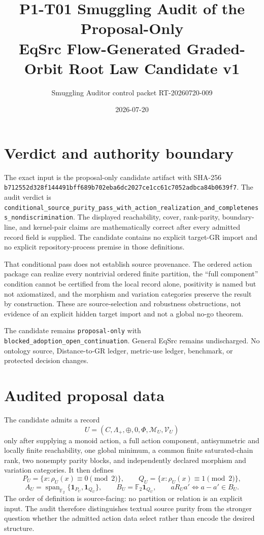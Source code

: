 \documentclass[11pt]{article}
\title{P1-T01 Smuggling Audit of the Proposal-Only\\
EqSrc Flow-Generated Graded-Orbit Root Law Candidate v1}
\author{Smuggling Auditor control packet RT-20260720-009}
\date{2026-07-20}
\newcommand{\Ftwo}{\mathbb F_2}
\begin{document}
\maketitle

\section{Verdict and authority boundary}

The exact input is the proposal-only candidate artifact with SHA-256
\texttt{b712552d328f144491bff689b702eba6dc2027ce1cc61c7052adbca84b0639f7}.
The audit verdict is
\texttt{conditional\_source\_purity\_pass\_with\_action\_realization\_and\_completeness\_nondiscrimination}.
The displayed reachability, cover, rank-parity, boundary-line, and kernel-pair
claims are mathematically correct after every admitted record field is
supplied. The candidate contains no explicit target-GR import and no explicit
repository-process premise in those definitions.

That conditional pass does not establish source provenance. The ordered
action package can realize every nontrivial ordered finite partition, the
``full component'' condition cannot be certified from the local record alone,
positivity is named but not axiomatized, and the morphism and variation
categories preserve the result by construction. These are source-selection
and robustness obstructions, not evidence of an explicit hidden target import
and not a global no-go theorem.

The candidate remains \texttt{proposal-only} with
\texttt{blocked\_adoption\_open\_continuation}. General EqSrc remains
undischarged. No ontology source, Distance-to-GR ledger, metric-use ledger,
benchmark, or protected decision changes.

\section{Audited proposal data}

The candidate admits a record
\[
 U=(C,\Lambda_+,\oplus,0,\Phi,\mathcal M_U,\mathcal V_U)
\]
only after supplying a monoid action, a full action component, antisymmetric
and locally finite reachability, one global minimum, a common finite
saturated-chain rank, two nonempty parity blocks, and independently declared
morphism and variation categories. It then defines
\[
 P_U=\{x:\rho_U(x)\equiv0\pmod2\},\qquad
 Q_U=\{x:\rho_U(x)\equiv1\pmod2\},
\]
\[
 A_U=\operatorname{span}_{\Ftwo}\{\mathbf1_{P_U},\mathbf1_{Q_U}\},
 \qquad B_U=\Ftwo\mathbf1_{Q_U},
 \qquad aR_Ua'\Longleftrightarrow a-a'\in B_U.
\]
The order of definition is source-facing: no partition or relation is an
explicit input. The audit therefore distinguishes textual source purity from
the stronger question whether the admitted action data select rather than
encode the desired structure.
\end{document}
